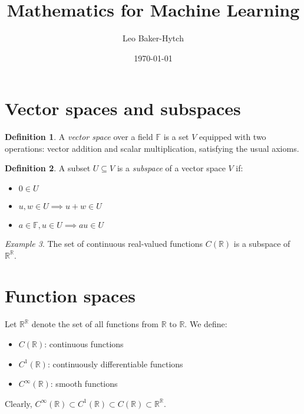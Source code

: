 \documentclass[11pt]{article}
\title{Mathematics for Machine Learning}
\author{Leo Baker-Hytch}
\date{\today}
\newcommand{\F}{\mathbb{F}}
\newcommand{\R}{\mathbb{R}}
\theoremstyle{definition}
\newtheorem{definition}{Definition}[section]
\theoremstyle{plain}
\theoremstyle{remark}
\newtheorem{example}[definition]{Example}
\begin{document}
\maketitle
\tableofcontents
\vspace{1em}

\section{Vector spaces and subspaces}

\begin{definition}
    A \emph{vector space} over a field \( \F \) is a set \( V \) equipped with two operations: vector addition and
    scalar multiplication, satisfying the usual axioms.
\end{definition}

\begin{definition}
    A subset \( U \subseteq V \) is a \emph{subspace} of a vector space \( V \) if:
    \begin{itemize}
        \item \( 0 \in U \)
        \item \( u, w \in U \implies u + w \in U \)
        \item \( a \in \F, u \in U \implies a u \in U \)
    \end{itemize}
\end{definition}

\begin{example}
    The set of continuous real-valued functions \( C(\R) \) is a subspace of \( \R^\R \).
\end{example}

\section{Function spaces}

Let \( \R^\R \) denote the set of all functions from \( \R \) to \( \R \). We define:

\begin{itemize}
    \item \( C(\R) \): continuous functions
    \item \( C^1(\R) \): continuously differentiable functions
    \item \( C^\infty(\R) \): smooth functions
\end{itemize}

Clearly, \( C^\infty(\R) \subset C^1(\R) \subset C(\R) \subset \R^\R \).
\end{document}
